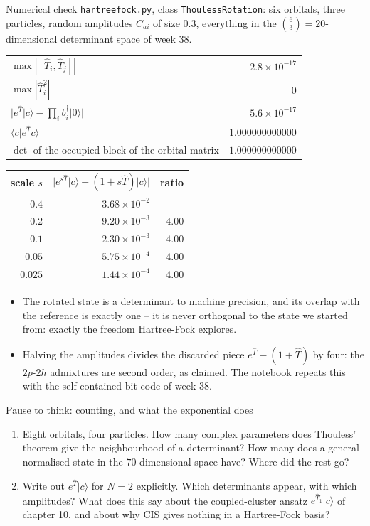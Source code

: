 \documentclass[aspectratio=169,10pt]{beamer}
\newcounter{thinkctr}
\newcommand{\thinkq}[2]{%
  \stepcounter{thinkctr}%
  \begin{tcolorbox}[colback=palewarm,colframe=warm,title={\bfseries Pause to think \#\thethinkctr\hfill\mdseries\small(about #1 min -- discuss with your neighbour)},fonttitle=\bfseries]
  #2
  \end{tcolorbox}}
\newcommand{\ket}[1]{\vert #1\rangle}
\newcommand{\braket}[2]{\langle #1\vert #2\rangle}
\begin{document}
\begin{frame}{Numerical check}
  \footnotesize
  \texttt{hartreefock.py}, class \texttt{ThoulessRotation}: six orbitals, three particles, random amplitudes $C_{ai}$ of size $0.3$, everything in the $\binom63=20$-dimensional determinant space of week 38.
  \begin{center}\scriptsize
  \renewcommand{\arraystretch}{1.1}
  \begin{tabular}{lr}\toprule
  $\max|[\hat{T}_i,\hat{T}_j]|$ & $2.8\times10^{-17}$\\
  $\max|\hat{T}_i^2|$ & $0$\\
  $\bigl|e^{\hat{T}}\ket{c}-\prod_ib_i^{\dagger}\ket{0}\bigr|$ & $5.6\times10^{-17}$\\
  $\braket{c}{e^{\hat{T}}c}$ & $1.000000000000$\\
  $\det$ of the occupied block of the orbital matrix & $1.000000000000$\\\bottomrule
  \end{tabular}
  \qquad
  \begin{tabular}{rrr}\toprule
  scale $s$ & $\bigl|e^{s\hat{T}}\ket{c}-(1+s\hat{T})\ket{c}\bigr|$ & ratio\\\midrule
  $0.4$ & $3.68\times10^{-2}$ & \\
  $0.2$ & $9.20\times10^{-3}$ & $4.00$\\
  $0.1$ & $2.30\times10^{-3}$ & $4.00$\\
  $0.05$ & $5.75\times10^{-4}$ & $4.00$\\
  $0.025$ & $1.44\times10^{-4}$ & $4.00$\\\bottomrule
  \end{tabular}
  \end{center}
  \begin{itemize}
    \item The rotated state is a determinant to machine precision, and its overlap with the reference is exactly one -- it is never orthogonal to the state we started from: exactly the freedom Hartree-Fock explores.
    \item Halving the amplitudes divides the discarded piece $e^{\hat{T}}-(1+\hat{T})$ by four: the $2p$-$2h$ admixtures are second order, as claimed. The notebook repeats this with the self-contained bit code of week 38.
  \end{itemize}
\end{frame}

\begin{frame}{Pause to think: counting, and what the exponential does}
  \thinkq{3}{
  \begin{enumerate}
    \item Eight orbitals, four particles. How many complex parameters does Thouless' theorem give the neighbourhood of a determinant? How many does a general normalised state in the $70$-dimensional space have? Where did the rest go?
    \item Write out $e^{\hat{T}}\ket{c}$ for $N=2$ explicitly. Which determinants appear, with which amplitudes? What does this say about the coupled-cluster ansatz $e^{\hat{T}_1}\ket{c}$ of chapter 10, and about why CIS gives nothing in a Hartree-Fock basis?
  \end{enumerate}}
\end{frame}
\end{document}
